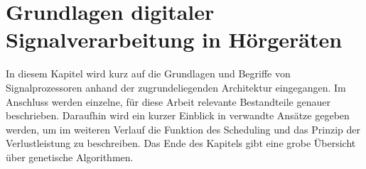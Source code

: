 \chapter{Grundlagen digitaler Signalverarbeitung in Hörgeräten}
\label{chap:grundlagen}
In diesem Kapitel wird kurz auf die Grundlagen und Begriffe von Signalprozessoren anhand der zugrundeliegenden Architektur eingegangen. Im Anschluss werden einzelne, für diese Arbeit relevante Bestandteile genauer beschrieben. Daraufhin wird ein kurzer Einblick in verwandte Ansätze gegeben werden, um im weiteren Verlauf die Funktion des Scheduling und das Prinzip der Verlustleistung zu beschreiben. Das Ende des Kapitels gibt eine grobe Übersicht über genetische Algorithmen.




